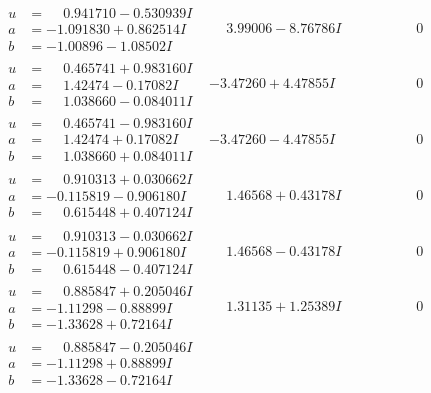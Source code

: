 \documentclass[1p]{elsarticle_modified}
\theoremstyle{definition}
\begin{document}
$$\begin{array}{c|c|c}
\begin{aligned}
u &= \phantom{-}0.941710 - 0.530939 I \\
a &= -1.091830 + 0.862514 I \\
b &= -1.00896 - 1.08502 I\end{aligned}
 & \phantom{-}3.99006 - 8.76786 I & \phantom{-0.000000 } 0 \\ \hline\begin{aligned}
u &= \phantom{-}0.465741 + 0.983160 I \\
a &= \phantom{-}1.42474 - 0.17082 I \\
b &= \phantom{-}1.038660 - 0.084011 I\end{aligned}
 & -3.47260 + 4.47855 I & \phantom{-0.000000 } 0 \\ \hline\begin{aligned}
u &= \phantom{-}0.465741 - 0.983160 I \\
a &= \phantom{-}1.42474 + 0.17082 I \\
b &= \phantom{-}1.038660 + 0.084011 I\end{aligned}
 & -3.47260 - 4.47855 I & \phantom{-0.000000 } 0 \\ \hline\begin{aligned}
u &= \phantom{-}0.910313 + 0.030662 I \\
a &= -0.115819 - 0.906180 I \\
b &= \phantom{-}0.615448 + 0.407124 I\end{aligned}
 & \phantom{-}1.46568 + 0.43178 I & \phantom{-0.000000 } 0 \\ \hline\begin{aligned}
u &= \phantom{-}0.910313 - 0.030662 I \\
a &= -0.115819 + 0.906180 I \\
b &= \phantom{-}0.615448 - 0.407124 I\end{aligned}
 & \phantom{-}1.46568 - 0.43178 I & \phantom{-0.000000 } 0 \\ \hline\begin{aligned}
u &= \phantom{-}0.885847 + 0.205046 I \\
a &= -1.11298 - 0.88899 I \\
b &= -1.33628 + 0.72164 I\end{aligned}
 & \phantom{-}1.31135 + 1.25389 I & \phantom{-0.000000 } 0 \\ \hline\begin{aligned}
u &= \phantom{-}0.885847 - 0.205046 I \\
a &= -1.11298 + 0.88899 I \\
b &= -1.33628 - 0.72164 I\end{aligned}

\end{array}$$
\end{document}
